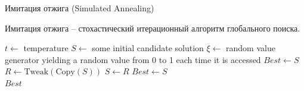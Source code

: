 \documentclass{beamer}
\begin{document}
\begin{frame}{Имитация отжига (Simulated Annealing)}
    \small

    Имитация отжига -- стохастический итерационный алгоритм глобального поиска.

    
\begin{algorithmic}[1]
\State $t \gets $ temperature
\State $S \gets $ some initial candidate solution
\State $\xi \gets $ random value generator yielding a random value from 0 to 1 each time it is accessed
\State $Best \gets S$
\Repeat
    \State $R \gets \text{Tweak}(\text{Copy}(S))$
        \State $S \gets R$
    \EndIf
        \State $Best \gets S$
    \EndIf
{}\\
\Return $Best$
\end{algorithmic}
\end{frame}
\end{document}
